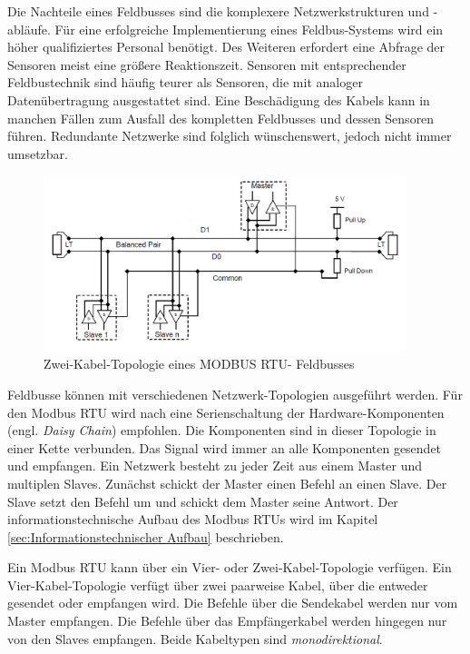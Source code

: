 Die Nachteile eines Feldbusses sind die komplexere Netzwerkstrukturen und -abläufe. Für eine erfolgreiche Implementierung eines Feldbus-Systems wird ein höher qualifiziertes Personal benötigt. Des Weiteren erfordert eine Abfrage der Sensoren meist eine größere Reaktionszeit. Sensoren mit  entsprechender Feldbustechnik sind häufig teurer als Sensoren, die mit analoger Datenübertragung ausgestattet sind. Eine Beschädigung des Kabels kann in manchen Fällen zum Ausfall des kompletten Feldbusses und dessen Sensoren führen. Redundante Netzwerke sind folglich wünschenswert, jedoch nicht immer umsetzbar. 

\begin{figure}[htb]
 \centering		\includegraphics[width=0.94\textwidth]{Pictures/TopologieModbus.png}
 \caption{Zwei-Kabel-Topologie eines MODBUS RTU- Feldbusses \citep{MODBUS.ORG2002}  }
 \label{fig:ZweiKabelModbus}
 \end{figure} 

Feldbusse können mit verschiedenen Netzwerk-Topologien ausgeführt werden. Für den Modbus RTU wird nach \citep{MODBUS.ORG2002} eine Serienschaltung der Hardware-Komponenten (engl. \textit{Daisy Chain}) empfohlen. Die Komponenten sind in dieser Topologie in einer Kette verbunden. Das Signal wird immer an alle Komponenten gesendet und empfangen. Ein Netzwerk besteht zu jeder Zeit aus einem Master und multiplen Slaves. Zunächst schickt der Master einen Befehl an einen Slave. Der Slave setzt den Befehl um und schickt dem Master seine Antwort. Der informationstechnische Aufbau des Modbus RTUs wird im Kapitel \ref{sec:Informationstechnischer Aufbau} beschrieben. 



Ein Modbus RTU kann über ein Vier- oder Zwei-Kabel-Topologie verfügen. Ein Vier-Kabel-Topologie verfügt über zwei paarweise Kabel, über die entweder gesendet oder empfangen wird. Die Befehle über die Sendekabel werden nur vom Master empfangen. Die Befehle über das Empfängerkabel werden hingegen nur von den Slaves empfangen. Beide Kabeltypen sind \textit{monodirektional}.
 
